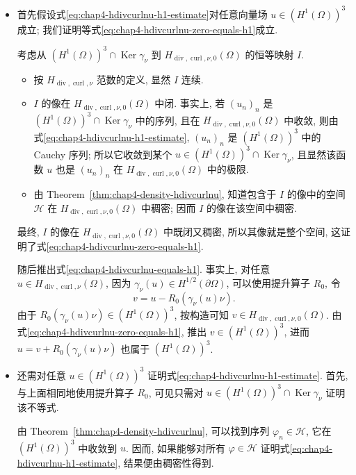 \begin{Proof}
\begin{itemize}
 \item 首先假设式\eqref{eq:chap4-hdivcurlnu-h1-estimate}对任意向量场
 $u\in(H^1(\Omega))^3$ 成立; 我们证明等式\eqref{eq:chap4-hdivcurlnu-zero-equals-h1}成立.

 考虑从 $(H^1(\Omega))^3\cap\operatorname{Ker}\gamma_\nu$ 到
 $H_{\operatorname{div},\operatorname{curl},\nu,0}(\Omega)$ 的恒等映射 $I$.
 \begin{itemize}
  \item 按 $H_{\operatorname{div},\operatorname{curl},\nu}$ 范数的定义, 显然 $I$ 连续.
  \item $I$ 的像在 $H_{\operatorname{div},\operatorname{curl},\nu,0}(\Omega)$ 中闭.
  事实上, 若 $(u_n)_n$ 是 $(H^1(\Omega))^3\cap\operatorname{Ker}\gamma_\nu$ 中的序列,
  且在 $H_{\operatorname{div},\operatorname{curl},\nu,0}(\Omega)$ 中收敛, 则由
  式\eqref{eq:chap4-hdivcurlnu-h1-estimate}, $(u_n)_n$ 是 $(H^1(\Omega))^3$ 中的 Cauchy 序列;
  所以它收敛到某个 $u\in(H^1(\Omega))^3\cap\operatorname{Ker}\gamma_\nu$, 且显然该函数 $u$ 也是
  $(u_n)_n$ 在 $H_{\operatorname{div},\operatorname{curl},\nu,0}(\Omega)$ 中的极限.
  \item 由 Theorem~\ref{thm:chap4-density-hdivcurlnu}, 知道包含于 $I$ 的像中的空间
  $\mathcal H$ 在 $H_{\operatorname{div},\operatorname{curl},\nu,0}(\Omega)$ 中稠密;
  因而 $I$ 的像在该空间中稠密.
 \end{itemize}
 最终, $I$ 的像在 $H_{\operatorname{div},\operatorname{curl},\nu,0}(\Omega)$ 中既闭又稠密,
 所以其像就是整个空间, 这证明了式\eqref{eq:chap4-hdivcurlnu-zero-equals-h1}.

 随后推出式\eqref{eq:chap4-hdivcurlnu-equals-h1}. 事实上, 对任意
 $u\in H_{\operatorname{div},\operatorname{curl},\nu}(\Omega)$, 因为
 $\gamma_\nu(u)\in H^{1/2}(\partial\Omega)$, 可以使用提升算子 $R_0$, 令
 \[
  v=u-R_0(\gamma_\nu(u)\nu).
 \]
 由于 $R_0(\gamma_\nu(u)\nu)\in(H^1(\Omega))^3$, 按构造可知
 $v\in H_{\operatorname{div},\operatorname{curl},\nu,0}(\Omega)$.
 由式\eqref{eq:chap4-hdivcurlnu-zero-equals-h1}, 推出 $v\in(H^1(\Omega))^3$,
 进而 $u=v+R_0(\gamma_\nu(u)\nu)$ 也属于 $(H^1(\Omega))^3$.

 \item 还需对任意 $u\in(H^1(\Omega))^3$ 证明式\eqref{eq:chap4-hdivcurlnu-h1-estimate}.
 首先, 与上面相同地使用提升算子 $R_0$, 可见只需对
 $u\in(H^1(\Omega))^3\cap\operatorname{Ker}\gamma_\nu$ 证明该不等式.

 由 Theorem~\ref{thm:chap4-density-hdivcurlnu}, 可以找到序列 $\varphi_n\in\mathcal H$,
 它在 $(H^1(\Omega))^3$ 中收敛到 $u$. 因而, 如果能够对所有 $\varphi\in\mathcal H$
 证明式\eqref{eq:chap4-hdivcurlnu-h1-estimate}, 结果便由稠密性得到.


\end{itemize}
\end{Proof}
